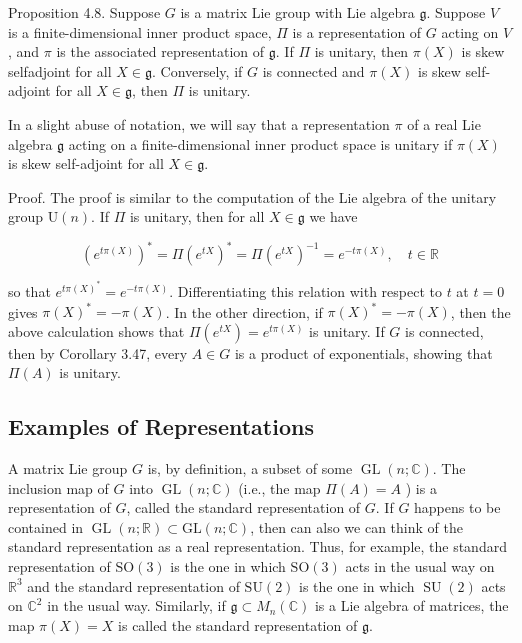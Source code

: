 \documentclass[10pt, letterpaper]{article}
\begin{document}
Proposition 4.8. Suppose $G$ is a matrix Lie group with Lie algebra $\mathfrak{g}$. Suppose $V$ is a finite-dimensional inner product space, $\Pi$ is a representation of $G$ acting on $V$, and $\pi$ is the associated representation of $\mathfrak{g}$. If $\Pi$ is unitary, then $\pi(X)$ is skew selfadjoint for all $X \in \mathfrak{g}$. Conversely, if $G$ is connected and $\pi(X)$ is skew self-adjoint for all $X \in \mathfrak{g}$, then $\Pi$ is unitary.

In a slight abuse of notation, we will say that a representation $\pi$ of a real Lie algebra $\mathfrak{g}$ acting on a finite-dimensional inner product space is unitary if $\pi(X)$ is skew self-adjoint for all $X \in \mathfrak{g}$.

Proof. The proof is similar to the computation of the Lie algebra of the unitary group $\mathrm{U}(n)$. If $\Pi$ is unitary, then for all $X \in \mathfrak{g}$ we have

$$
\left(e^{t \pi(X)}\right)^{*}=\Pi\left(e^{t X}\right)^{*}=\Pi\left(e^{t X}\right)^{-1}=e^{-t \pi(X)}, \quad t \in \mathbb{R}
$$

so that $e^{t \pi(X)^{*}}=e^{-t \pi(X)}$. Differentiating this relation with respect to $t$ at $t=0$ gives $\pi(X)^{*}=-\pi(X)$. In the other direction, if $\pi(X)^{*}=-\pi(X)$, then the above calculation shows that $\Pi\left(e^{t X}\right)=e^{t \pi(X)}$ is unitary. If $G$ is connected, then by Corollary 3.47, every $A \in G$ is a product of exponentials, showing that $\Pi(A)$ is unitary.

\subsection*{Examples of Representations}
A matrix Lie group $G$ is, by definition, a subset of some $\operatorname{GL}(n ; \mathbb{C})$. The inclusion map of $G$ into $\operatorname{GL}(n ; \mathbb{C})$ (i.e., the map $\Pi(A)=A$ ) is a representation of $G$, called the standard representation of $G$. If $G$ happens to be contained in $\operatorname{GL}(n ; \mathbb{R}) \subset \mathrm{GL}(n ; \mathbb{C})$, then can also we can think of the standard representation as a real representation. Thus, for example, the standard representation of $\mathrm{SO}(3)$ is the one in which $\mathrm{SO}(3)$ acts in the usual way on $\mathbb{R}^{3}$ and the standard representation of $\mathrm{SU}(2)$ is the one in which $\operatorname{SU}(2)$ acts on $\mathbb{C}^{2}$ in the usual way. Similarly, if $\mathfrak{g} \subset M_{n}(\mathbb{C})$ is a Lie algebra of matrices, the map $\pi(X)=X$ is called the standard representation of $\mathfrak{g}$.
\end{document}
